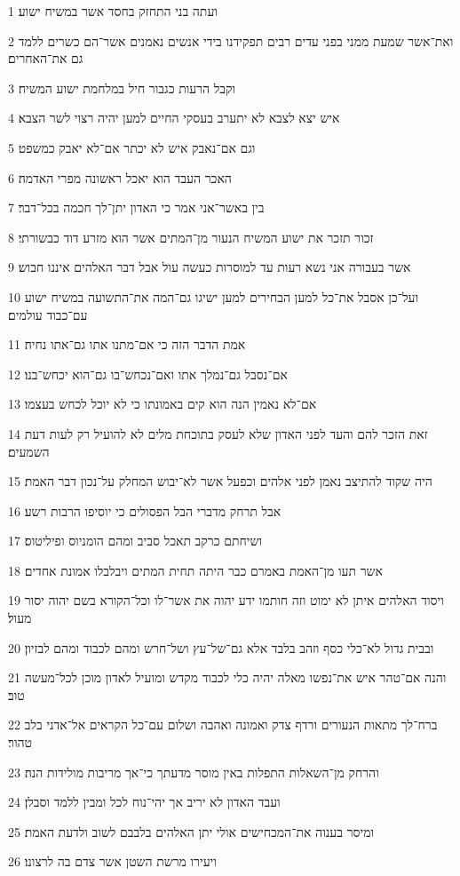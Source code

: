\par 1 ועתה בני התחזק בחסד אשר במשיח ישוע׃
\par 2 ואת־אשר שמעת ממני בפני עדים רבים תפקידנו בידי אנשים נאמנים אשר־הם כשרים ללמד גם את־האחרים׃
\par 3 וקבל הרעות כגבור חיל במלחמת ישוע המשיח׃
\par 4 איש יצא לצבא לא יתערב בעסקי החיים למען יהיה רצוי לשר הצבא׃
\par 5 וגם אם־נאבק איש לא יכתר אם־לא יאבק כמשפט׃
\par 6 האכר העבד הוא יאכל ראשונה מפרי האדמה׃
\par 7 בין באשר־אני אמר כי האדון יתן־לך חכמה בכל־דבר׃
\par 8 זכור תזכר את ישוע המשיח הנעור מן־המתים אשר הוא מזרע דוד כבשורתי׃
\par 9 אשר בעבורה אני נשא רעות עד למוסרות כעשה עול אבל דבר האלהים איננו חבוש׃
\par 10 ועל־כן אסבל את־כל למען הבחירים למען ישיגו גם־המה את־התשועה במשיח ישוע עם־כבוד עולמים׃
\par 11 אמת הדבר הזה כי אם־מתנו אתו גם־אתו נחיה׃
\par 12 אם־נסבל גם־נמלך אתו ואם־נכחש־בו גם־הוא יכחש־בנו׃
\par 13 אם־לא נאמין הנה הוא קים באמונתו כי לא יוכל לכחש בעצמו׃
\par 14 זאת הזכר להם והעד לפני האדון שלא לעסק בתוכחת מלים לא להועיל רק לעות דעת השמעים׃
\par 15 היה שקוד להתיצב נאמן לפני אלהים וכפעל אשר לא־יבוש המחלק על־נכון דבר האמת׃
\par 16 אבל תרחק מדברי הבל הפסולים כי יוסיפו הרבות רשע׃
\par 17 ושיחתם כרקב תאכל סביב ומהם הומניוס ופיליטוס׃
\par 18 אשר תעו מן־האמת באמרם כבר היתה תחית המתים ויבלבלו אמונת אחדים׃
\par 19 ויסוד האלהים איתן לא ימוט וזה חותמו ידע יהוה את אשר־לו וכל־הקורא בשם יהוה יסור מעול׃
\par 20 ובבית גדול לא־כלי כסף וזהב בלבד אלא גם־של־עץ ושל־חרש ומהם לכבוד ומהם לבזיון׃
\par 21 והנה אם־טהר איש את־נפשו מאלה יהיה כלי לכבוד מקדש ומועיל לאדון מוכן לכל־מעשה טוב׃
\par 22 ברח־לך מתאות הנעורים ורדף צדק ואמונה ואהבה ושלום עם־כל הקראים אל־אדני בלב טהור׃
\par 23 והרחק מן־השאלות התפלות באין מוסר מדעתך כי־אך מריבות מולידות הנה׃
\par 24 ועבד האדון לא יריב אך יהי־נוח לכל ומבין ללמד וסבלן׃
\par 25 ומיסר בענוה את־המכחישים אולי יתן האלהים בלבבם לשוב ולדעת האמת׃
\par 26 ויעירו מרשת השטן אשר צדם בה לרצונו׃

